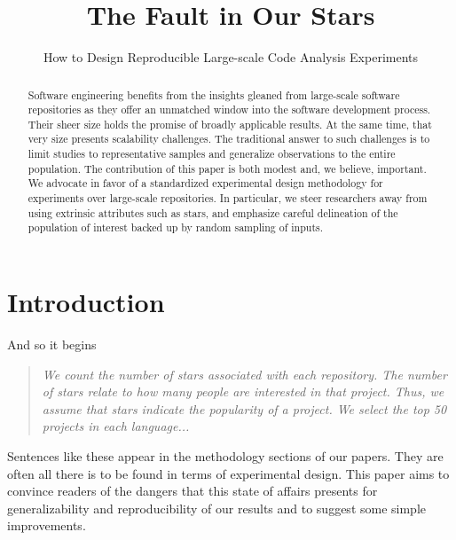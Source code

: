 \documentclass[sigconf,review,anonymous]{acmart}
\begin{document}
\title{The Fault in Our Stars}
\subtitle{How to Design Reproducible Large-scale Code Analysis Experiments}

\renewcommand{\c}[1]{\lstinline|#1|\xspace}

\begin{abstract}
  Software engineering benefits from the insights gleaned from large-scale
  software repositories as they offer an unmatched window into the software
  development process. Their sheer size holds the promise of broadly applicable
  results. At the same time, that very size presents scalability challenges. The
  traditional answer to such challenges is to limit studies to representative
  samples and generalize observations to the entire population. The contribution
  of this paper is both modest and, we believe, important. We advocate in favor
  of a standardized experimental design methodology for experiments over large-scale
  repositories. In particular, we steer researchers away from using extrinsic
  attributes such as stars, and emphasize careful delineation of the population
  of interest backed up by random sampling of inputs.
\end{abstract}
\maketitle

\section{Introduction}

And so it begins

\begin{quote}\small\it
We count the number of stars associated with each repository. The number of
stars relate to how many people are interested in that project. Thus, we assume
that stars indicate the popularity of a project. We select the top 50 projects
in each language...
\end{quote}

\noindent
Sentences like these appear in the methodology sections of our papers. They are
often all there is to be found in terms of experimental design. This paper aims
to convince readers of the dangers that this state of affairs presents for
generalizability and reproducibility of our results and to suggest some simple
improvements.
\end{document}
